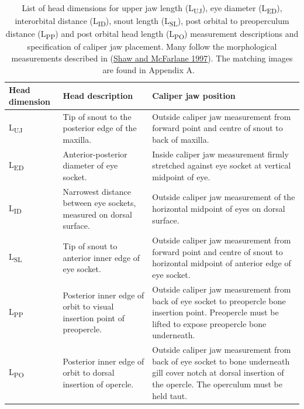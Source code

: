 \documentclass[12pt]{article}\usepackage[]{graphicx}\usepackage[]{color}
\begin{document}
\begin{table}[!h]

\caption{\label{tab:table1}List of head dimensions for upper jaw length (L\textsubscript{UJ}), eye diameter (L\textsubscript{ED}), interorbital distance (L\textsubscript{ID}), snout length (L\textsubscript{SL}), post orbital to preoperculum distance (L\textsubscript{PP}) and post orbital head length (L\textsubscript{PO}) measurement descriptions and specification of caliper jaw placement. Many follow the morphological measurements described in (\protect\hyperlink{ref-Shaw1997}{Shaw and McFarlane 1997}). The matching images are found in Appendix A. ~\\
\hspace*{0.333em}\hspace*{0.333em}}
\fontsize{10}{12}\selectfont
\begin{tabular}[t]{>{\raggedright\arraybackslash}p{1.9cm}>{\raggedright\arraybackslash}p{6.0cm}>{\raggedright\arraybackslash}p{7.5cm}}
\toprule
\textbf{Head dimension} & \textbf{Head description} & \textbf{Caliper jaw position}\\
\midrule
L\textsubscript{UJ} & Tip of snout to the posterior edge of the maxilla. & Outside caliper jaw measurement from forward point and centre of snout to back of maxilla.\\
\midrule
L\textsubscript{ED} & Anterior-posterior diameter of eye socket. & Inside caliper jaw measurement firmly stretched against eye socket at vertical midpoint of eye.\\
\midrule
L\textsubscript{ID} & Narrowest distance between eye sockets, measured on dorsal surface. & Outside caliper jaw measurement of the horizontal midpoint of eyes on dorsal surface.\\
\midrule
L\textsubscript{SL} & Tip of snout to anterior inner edge of eye socket. & Outside caliper jaw measurement from forward point and centre of snout to horizontal midpoint of anterior edge of eye socket.\\
\midrule
L\textsubscript{PP} & Posterior inner edge of orbit to visual insertion point of preopercle. & Outside caliper jaw measurement from back of eye socket to preopercle bone insertion point. Preopercle must be lifted to expose preopercle bone underneath.\\
\midrule
L\textsubscript{PO} & Posterior inner edge of orbit to dorsal insertion of opercle. & Outside caliper jaw measurement from back of eye socket to bone underneath gill cover notch at dorsal insertion of the opercle.  The operculum must be held taut.\\
\bottomrule
\end{tabular}
\end{table}
~\\
\hspace*{0.333em}\\
\end{document}

